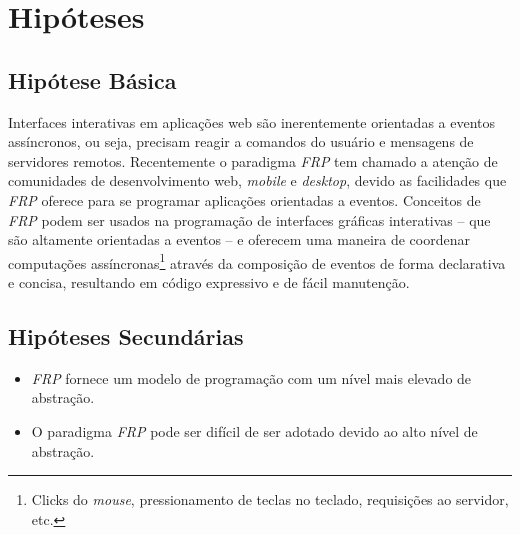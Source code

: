 \section{Hipóteses}\label{lhipoteses}


\subsection{Hipótese Básica}

Interfaces interativas em aplicações web
são inerentemente orientadas a eventos assíncronos,
ou seja, precisam reagir a comandos do usuário e
mensagens de servidores remotos.
Recentemente o paradigma \textit{FRP}
tem chamado a atenção de
comunidades de desenvolvimento web, \textit{mobile}
e \textit{desktop}, devido as facilidades que \textit{FRP}
oferece para se programar aplicações orientadas a eventos.
Conceitos de \textit{FRP} podem ser usados
na programação de interfaces gráficas interativas
-- que são altamente orientadas a eventos --
e oferecem uma maneira de coordenar
computações assíncronas\footnote{
  Clicks do \textit{mouse}, pressionamento de teclas no teclado,
  requisições ao servidor, etc.
}
através da composição de eventos de forma declarativa
e concisa, resultando em código expressivo e de fácil
manutenção.


\subsection{Hipóteses Secundárias}

\begin{itemize}[noitemsep]
  \item \textit{FRP} fornece um modelo de programação com um
        nível mais elevado de abstração.
  \item O paradigma \textit{FRP} pode ser difícil de ser adotado
        devido ao alto nível de abstração.
\end{itemize}

